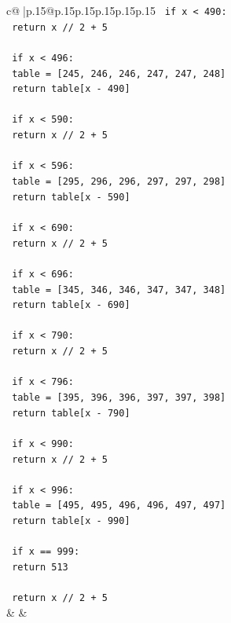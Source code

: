 \documentclass{article}
\begin{document}
{\begin{supertabular}{c@{$\;$}|p{.15\linewidth}@{}p{.15\linewidth}p{.15\linewidth}p{.15\linewidth}p{.15\linewidth}p{.15\linewidth}}
{{{\texttt{    if x < 490:} \\
\texttt{        return x // 2 + 5} \\
\\ 
\texttt{    if x < 496:} \\
\texttt{        table = {[}245, 246, 246, 247, 247, 248{]}} \\
\texttt{        return table{[}x {-} 490{]}} \\
\\ 
\texttt{    if x < 590:} \\
\texttt{        return x // 2 + 5} \\
\\ 
\texttt{    if x < 596:} \\
\texttt{        table = {[}295, 296, 296, 297, 297, 298{]}} \\
\texttt{        return table{[}x {-} 590{]}} \\
\\ 
\texttt{    if x < 690:} \\
\texttt{        return x // 2 + 5} \\
\\ 
\texttt{    if x < 696:} \\
\texttt{        table = {[}345, 346, 346, 347, 347, 348{]}} \\
\texttt{        return table{[}x {-} 690{]}} \\
\\ 
\texttt{    if x < 790:} \\
\texttt{        return x // 2 + 5} \\
\\ 
\texttt{    if x < 796:} \\
\texttt{        table = {[}395, 396, 396, 397, 397, 398{]}} \\
\texttt{        return table{[}x {-} 790{]}} \\
\\ 
\texttt{    if x < 990:} \\
\texttt{        return x // 2 + 5} \\
\\ 
\texttt{    if x < 996:} \\
\texttt{        table = {[}495, 495, 496, 496, 497, 497{]}} \\
\texttt{        return table{[}x {-} 990{]}} \\
\\ 
\texttt{    if x == 999:} \\
\texttt{        return 513} \\
\\ 
\texttt{    return x // 2 + 5} \\
            }
        }
    }
    & & \\ \\


\end{supertabular}}
\end{document}
